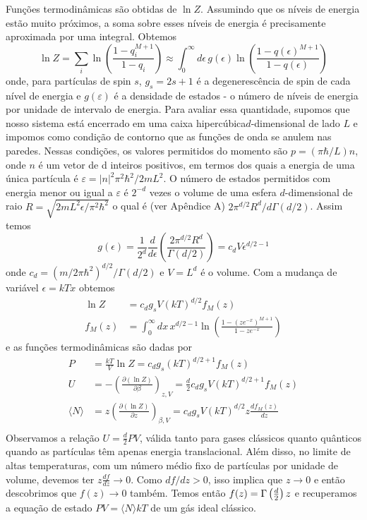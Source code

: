 \documentclass[12pt]{article}
\begin{document}
Funções termodinâmicas são obtidas de $ \ln Z$. Assumindo que os níveis de energia estão muito próximos, a soma sobre esses níveis de energia é precisamente aproximada por uma integral. Obtemos 
\[
\ln Z = \sum_i \ln \left( \frac{1 - q_i^{M+1}}{1 - q_i} \right) 
\approx \int_0^\infty d\epsilon \, g(\epsilon) \ln \left( \frac{1 - q(\epsilon)^{M+1}}{1 - q(\epsilon)} \right)
\]
onde, para partículas de spin $s$, $g_s = 2s + 1$ é a degenerescência de spin de cada nível de energia e $g(\varepsilon)$ é a densidade de estados - o número de níveis de energia por unidade de intervalo de energia. Para avaliar essa quantidade, supomos que nosso sistema está encerrado em uma caixa hipercúbica$ d$-dimensional de lado $L$ e impomos como condição de contorno que as funções de onda se anulem nas paredes. Nessas condições, os valores permitidos do momento são $p = (\pi \hbar/L)n$, onde $n$ é um vetor de d inteiros positivos, em termos dos quais a energia de uma única partícula é $\varepsilon = |n|^2\pi^2\hbar^2/2mL^2$. O número de estados permitidos com energia menor ou igual a $\varepsilon$ é $2^{-d}$ vezes o volume de uma esfera $d$-dimensional de raio $R = \sqrt{2mL^2 \epsilon / \pi^2 \hbar^2}$ o qual é (ver Apêndice A) $2 \pi^{d/2} R^d / d \Gamma(d/2)$. Assim temos 
\[
g(\epsilon) = \frac{1}{2^d} \frac{d}{d \epsilon} \left( \frac{2 \pi^{d/2} R^d}{\Gamma(d/2)} \right) = c_d V \epsilon^{d/2 - 1}
\]
onde $c_d = (m/2 \pi \hbar^2)^{d/2} / \Gamma(d/2)$ e $V = L^d$ é o volume. Com a mudança de variável $\epsilon = kTx $ obtemos
\[
\begin{aligned}
\ln Z &= c_d g_s V (kT)^{d/2} f_M(z) \\
f_M(z) &= \int_0^\infty dx \, x^{d/2 - 1} \ln \left( \frac{1 - (ze^{-x})^{M+1}}{1 - ze^{-x}} \right)
\end{aligned}
\]
e as funções termodinâmicas são dadas por
\[
\begin{aligned}
P &= \frac{kT}{V} \ln Z = c_d g_s (kT)^{d/2 + 1} f_M(z) \\
U &= - \left( \frac{\partial (\ln Z)}{\partial \beta} \right)_{z, V} = \frac{d}{2} c_d g_s V (kT)^{d/2 + 1} f_M(z) \\
\langle N \rangle &= z \left( \frac{\partial (\ln Z)}{\partial z} \right)_{\beta, V} = c_d g_s V (kT)^{d/2} z \frac{d f_M(z)}{dz} \\
\end{aligned}
\]
Observamos a relação $U = \frac{d}{2} PV $, válida tanto para gases clássicos quanto quânticos quando as partículas têm apenas energia translacional. Além disso, no limite de altas temperaturas, com um número médio fixo de partículas por unidade de volume, devemos ter $z \frac{df}{dz} \rightarrow 0 $. Como $df/dz > 0$, isso implica que $z \rightarrow 0$ e então descobrimos que $f(z) \rightarrow 0 $ também. Temos então $f(z) = \Gamma \left( \frac{d}{2} \right) z \\$ e recuperamos a equação de estado $PV = \langle N \rangle kT$ de um gás ideal clássico. 
\end{document}

